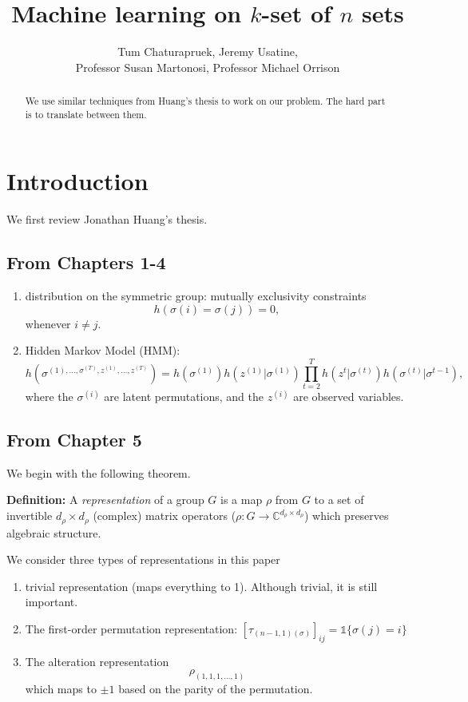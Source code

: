 \documentclass[10pt,reqno]{amsart}
\newcommand{\C}{\mathbb{C}}
\theoremstyle{definition}
\numberwithin{equation}{section}
\begin{document}
\title{Machine learning on $k$-set of $n$ sets}
\author{Tum Chaturapruek, Jeremy Usatine, 
\\Professor Susan Martonosi, Professor Michael Orrison} 
\maketitle

\begin{abstract}
We use similar techniques from Huang's thesis to 
work on our problem. The hard part
is to translate between them.
\end{abstract}


\section{Introduction}
We first review Jonathan Huang's thesis.
\subsection{From Chapters 1-4}
\begin{enumerate}
\item  distribution on the symmetric group:
mutually exclusivity constraints
\[h(\sigma(i) = \sigma(j)) = 0,\]
whenever $i\neq j.$
\item Hidden Markov Model (HMM):
\[h(\sigma^{(1), \ldots, \sigma^{(T)}, 
z^{(1)}, \ldots, z^{(T)}})
=
h(\sigma^{(1)}) h(z^{(1)}|\sigma^{(1)})
\prod_{t=2}^T h(z^t|\sigma^{(t)}) h(\sigma^{(t)}|\sigma^{t-1}),
\]
where the $\sigma^{(i)}$ are latent permutations, and
the $z^{(i)}$ are observed variables.
\end{enumerate}
\subsection{From Chapter 5}
We begin with the following theorem.

\noindent\textbf{Definition:} A \textit{representation} of a group $G$
is a map $\rho$ from $G$ to a set of
invertible $d_\rho\times d_\rho$ (complex)
matrix operators ($\rho:G\to \C^{d_\rho\times d_\rho}$)
which preserves algebraic structure.

We consider three types of representations in this paper
\begin{enumerate}
\item trivial representation (maps everything to 
1). Although trivial, it is still important.
\item The first-order permutation representation:
$[\tau_{(n-1, 1)(\sigma)}]_{ij}
= \mathbb{1}\{\sigma(j) = i\}
$
\item The alteration representation
\[\rho_{(1,1,1, \ldots, 1)}\]
which maps to $\pm 1$ based on the parity of
the permutation.
\end{enumerate}
\end{document}
